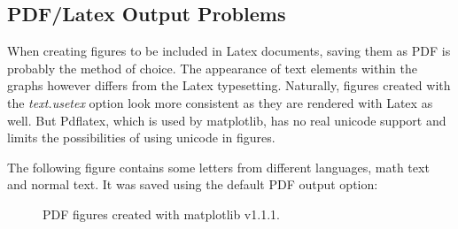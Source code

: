\documentclass[12pt, a4paper]{article}
\begin{document}
\subsection*{PDF/Latex Output Problems}
When creating figures to be included in Latex documents, saving them as PDF is probably the method of choice. The appearance of text elements within the graphs however differs from the Latex typesetting. Naturally, figures created with the \textit{text.usetex} option look more consistent as they are rendered with Latex as well. But Pdflatex, which is used by matplotlib, has no real unicode support and limits the possibilities of using unicode in figures.

The following figure contains some letters from different languages, math text and normal text. It was saved using the default PDF output option:

\begin{figure}[h]
\hspace{1mm}
\caption{PDF figures created with matplotlib v1.1.1.}
\end{figure}
\end{document}
